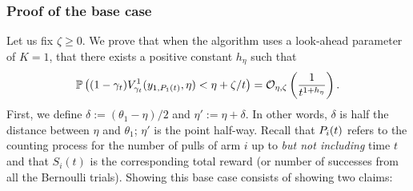 \begin{myproof}[Proof.]
	\subsubsection*{Proof of the base case}
	Let us fix $\zeta \ge 0$. We prove that when the algorithm uses a look-ahead parameter of $K = 1$, that there exists a positive constant $h_\eta$ such that
	 \begin{equation} \label{eqn:base_case_lemma_underestimation}
	 \mathbb{P} \left( (1-\gamma_t)V^1_{\gamma_t}(y_{1,P_{1}(t)}, \eta) < \eta + \zeta/t \right) = \mathcal{O}_{\eta,\zeta}\left(\frac{1}{t^{1 + h_\eta}}\right).
	 \end{equation}
	 First, we define $\delta := (\theta_1 - \eta)/2$ and  $\eta' :=  \eta + \delta$. In other words, $\delta$ is half the distance between $\eta$ and $\theta_1$; $\eta'$ is the point half-way. Recall that $P_{i}(t)$ refers to the counting process for the number of pulls of arm $i$ up to \emph{but not including} time $t$ and that $S_i(t)$ is the corresponding total reward (or number of successes from all the Bernoulli trials). Showing this base case consists of showing two claims:

\end{myproof}

